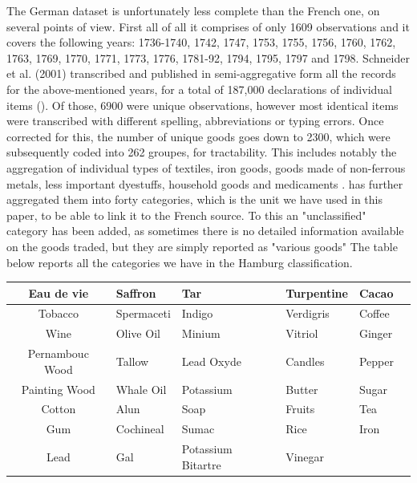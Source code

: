 \documentclass[12pt,a4paper,titlepage,english]{article}
\begin{document}
The German dataset is unfortunately less complete than the French one, on several points of view. First all of all it comprises of only 1609 observations and it covers the following years: 1736-1740, 1742, 1747, 1753, 1755, 1756, 1760, 1762, 1763, 1769, 1770, 1771, 1773, 1776, 1781-92, 1794, 1795, 1797 and 1798. 
Schneider et al. (2001) transcribed and published in semi-aggregative form all the records for the above-mentioned years, for a total of 187,000 declarations of individual items (\cite{pfister_great_2017}). 
Of those, 6900 were unique observations, however most identical items were transcribed with different spelling, abbreviations or typing errors. 
Once corrected for this, the number of unique goods goes down to 2300, which were subsequently coded into 262 groupes, for tractability. 
This includes notably the aggregation of individual types of textiles, iron goods, goods made of non-ferrous metals, less important dyestuffs, household goods and medicaments   \cite{pfister_great_2017}. 
\cite{pfister_great_2017} has further aggregated them into forty categories, which is the unit we have used in this paper, to be able to link it to the French source. 
To this an "unclassified" category has been added, as sometimes there is no detailed information available on the goods traded, but they are simply reported as "various goods"
The table below reports all the categories we have in the Hamburg classification. 

\begin{center}
 \label{tab:title} 
\begin{tabularx}{1\textwidth}{|c *{5}{|Y}|}
\hline
	Eau de vie & Saffron & Tar & Turpentine & Cacao \\ \hline
	Tobacco & Spermaceti & Indigo & Verdigris & Coffee \\ \hline
	Wine & Olive Oil & Minium  & Vitriol & Ginger \\ \hline
	Pernambouc Wood & Tallow & Lead Oxyde & Candles & Pepper \\ \hline
	Painting Wood & Whale Oil & Potassium & Butter & Sugar \\ \hline
	Cotton & Alun & Soap & Fruits & Tea \\ \hline
	Gum & Cochineal & Sumac & Rice & Iron \\ \hline
	Lead & Gal & Potassium Bitartre & Vinegar & \  \\ \hline
\end{tabularx}\\~\\
\end{center}
\end{document}
